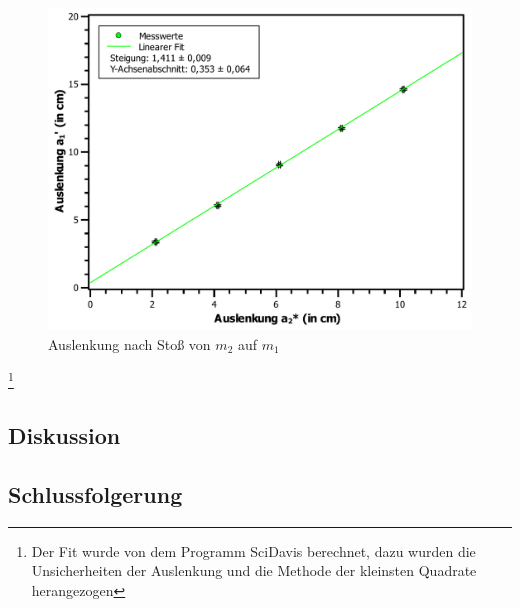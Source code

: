 			\begin{figure}[ht]
				\centering
				\includegraphics[width=\textwidth]{AuslenkungGross.pdf}
				\caption{Auslenkung nach Stoß von $m_2$ auf $m_1$}
				\label{abb:AuslenkungGross}	
			\end{figure}
			\footnote{Der Fit wurde von dem Programm SciDavis berechnet, dazu wurden die Unsicherheiten der Auslenkung und die Methode der kleinsten Quadrate herangezogen}
	\subsection{Diskussion}
	
	\subsection{Schlussfolgerung}